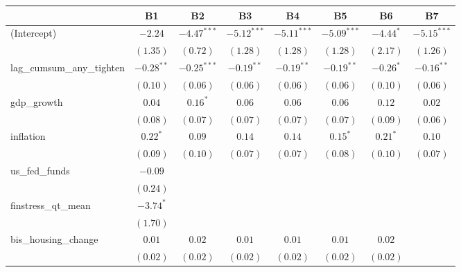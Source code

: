 
\begin{tabular}{l c c c c c c c }
\hline
 & B1 & B2 & B3 & B4 & B5 & B6 & B7 \\
\hline
(Intercept)                      & $-2.24$      & $-4.47^{***}$ & $-5.12^{***}$ & $-5.11^{***}$ & $-5.09^{***}$ & $-4.44^{*}$  & $-5.15^{***}$ \\
                                 & $(1.35)$     & $(0.72)$      & $(1.28)$      & $(1.28)$      & $(1.28)$      & $(2.17)$     & $(1.26)$      \\
lag\_cumsum\_any\_tighten        & $-0.28^{**}$ & $-0.25^{***}$ & $-0.19^{**}$  & $-0.19^{**}$  & $-0.19^{**}$  & $-0.26^{*}$  & $-0.16^{**}$  \\
                                 & $(0.10)$     & $(0.06)$      & $(0.06)$      & $(0.06)$      & $(0.06)$      & $(0.10)$     & $(0.06)$      \\
gdp\_growth                      & $0.04$       & $0.16^{*}$    & $0.06$        & $0.06$        & $0.06$        & $0.12$       & $0.02$        \\
                                 & $(0.08)$     & $(0.07)$      & $(0.07)$      & $(0.07)$      & $(0.07)$      & $(0.09)$     & $(0.06)$      \\
inflation                        & $0.22^{*}$   & $0.09$        & $0.14$        & $0.14$        & $0.15^{*}$    & $0.21^{*}$   & $0.10$        \\
                                 & $(0.09)$     & $(0.10)$      & $(0.07)$      & $(0.07)$      & $(0.08)$      & $(0.10)$     & $(0.07)$      \\
us\_fed\_funds                   & $-0.09$      &               &               &               &               &              &               \\
                                 & $(0.24)$     &               &               &               &               &              &               \\
finstress\_qt\_mean              & $-3.74^{*}$  &               &               &               &               &              &               \\
                                 & $(1.70)$     &               &               &               &               &              &               \\
bis\_housing\_change             & $0.01$       & $0.02$        & $0.01$        & $0.01$        & $0.01$        & $0.02$       &               \\
                                 & $(0.02)$     & $(0.02)$      & $(0.02)$      & $(0.02)$      & $(0.02)$      & $(0.02)$     &               \\

\end{tabular}
